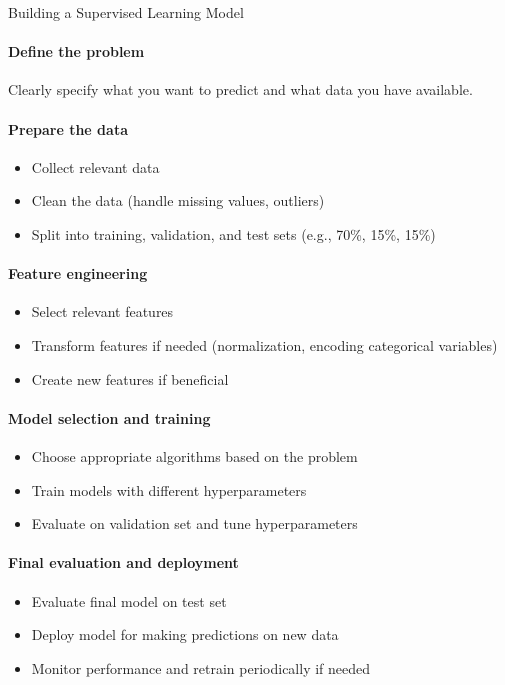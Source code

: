 \begin{KR}{Building a Supervised Learning Model}
\paragraph{Define the problem}
Clearly specify what you want to predict and what data you have available.

\paragraph{Prepare the data}
\begin{itemize}
    \item Collect relevant data
    \item Clean the data (handle missing values, outliers)
    \item Split into training, validation, and test sets (e.g., 70\%, 15\%, 15\%)
\end{itemize}

\paragraph{Feature engineering}
\begin{itemize}
    \item Select relevant features
    \item Transform features if needed (normalization, encoding categorical variables)
    \item Create new features if beneficial
\end{itemize}

\paragraph{Model selection and training}
\begin{itemize}
    \item Choose appropriate algorithms based on the problem
    \item Train models with different hyperparameters
    \item Evaluate on validation set and tune hyperparameters
\end{itemize}

\paragraph{Final evaluation and deployment}
\begin{itemize}
    \item Evaluate final model on test set
    \item Deploy model for making predictions on new data
    \item Monitor performance and retrain periodically if needed
\end{itemize}
\end{KR}



